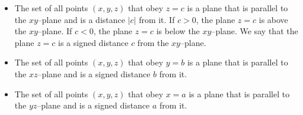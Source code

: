 \begin{itemize}\itemsep1pt \parskip0pt 
\item The set of all points $(x,y,z)$ that obey $z=c$ is a plane
that is parallel to the $xy$--plane and is a distance $|c|$ from it.
If $c>0$, the plane $z=c$ is above the $xy$--plane.
If $c<0$, the plane $z=c$ is below the $xy$--plane.
We say that the plane $z=c$ is a signed distance $c$ from the
$xy$--plane.

\item The set of all points $(x,y,z)$ that obey $y=b$ is a plane
that is parallel to the $xz$--plane and is a signed distance $b$ from it.

\item The set of all points $(x,y,z)$ that obey $x=a$ is a plane
that is parallel to the $yz$--plane and is a signed distance $a$ from it.
\end{itemize}
